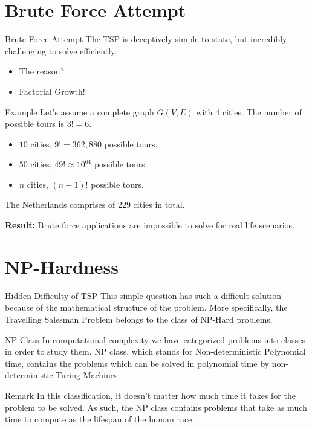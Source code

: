 \documentclass[aspectratio=169,xcolor=dvipsnames, t]{beamer}
\begin{document}
\section{Brute Force Attempt}
\begin{frame}{Brute Force Attempt}
	\vspace{-5mm}
	The TSP is deceptively simple to state, but incredibly challenging to solve efficiently.
	\begin{itemize}
		\item<2-> The reason?
		\item<3-> Factorial Growth!
	\end{itemize}

	\begin{block}{Example}
		Let's assume a complete graph \( G(V, E) \) with 4 cities. The number of possible tours is \( 3! = 6 \).
		\begin{itemize}
			\item<5-> \( 10 \) cities, \( 9! = 362,880 \) possible tours.
			\item<6-> \( 50 \) cities, \( 49! \approx 10^{64} \) possible tours.
			\item<7-> \( n \) cities, \( (n - 1)! \) possible tours.
		\end{itemize}
		The Netherlands comprises of 229 cities in total.
	\end{block}

	\textbf{Result:} Brute force applications are impossible to solve for real life scenarios.
\end{frame}

\section{NP-Hardness}
\begin{frame}{Hidden Difficulty of TSP}
	\vspace{-5mm}
	\onslide<1->This simple question has such a difficult solution because of the mathematical structure of the problem. More specifically, the Travelling Salesman Problem belongs to the class of NP-Hard problems.
	
	\begin{block}{NP Class}
		In computational complexity we have categorized problems into classes in order to study them. NP class, which stands for Non-deterministic Polynomial time, contains the problems which can be solved in polynomial time by non-deterministic Turing Machines.
	\end{block}

	\begin{alertblock}{Remark}
		In this classification, it doesn't matter how much time it takes for the problem to be solved. As such, the NP class contains problems that take as much time to compute as the lifespan of the human race.
	\end{alertblock}
\end{frame}
\end{document}
